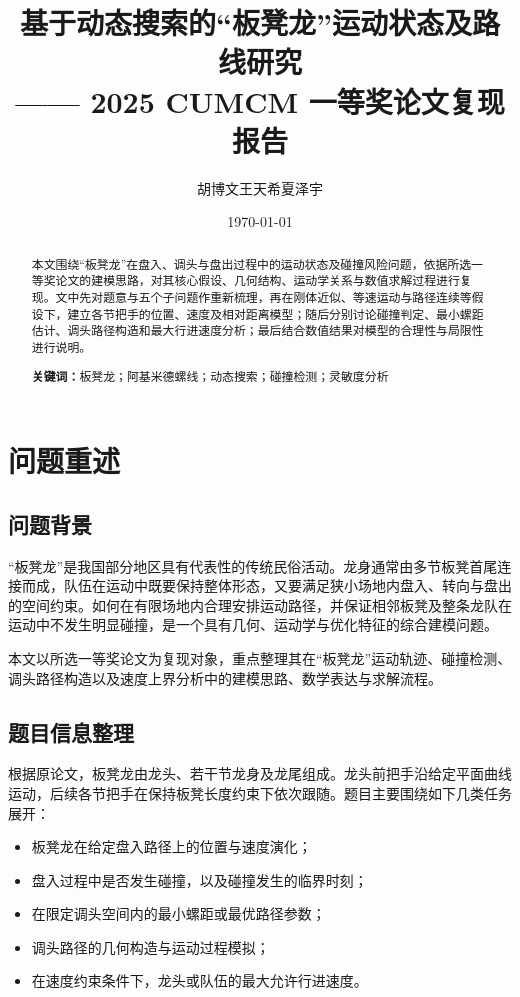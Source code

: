 \documentclass[12pt,a4paper]{ctexart}
\title{\heiti 基于动态搜索的“板凳龙”运动状态及路线研究\\[0.5em]
\large —— 2025 CUMCM 一等奖论文复现报告}
\author{胡博文\quad 王天希\quad 夏泽宇}
\date{\today}
\begin{document}
\maketitle

\begin{abstract}
本文围绕“板凳龙”在盘入、调头与盘出过程中的运动状态及碰撞风险问题，依据所选一等奖论文的建模思路，对其核心假设、几何结构、运动学关系与数值求解过程进行复现。文中先对题意与五个子问题作重新梳理，再在刚体近似、等速运动与路径连续等假设下，建立各节把手的位置、速度及相对距离模型；随后分别讨论碰撞判定、最小螺距估计、调头路径构造和最大行进速度分析；最后结合数值结果对模型的合理性与局限性进行说明。

\textbf{关键词：}板凳龙；阿基米德螺线；动态搜索；碰撞检测；灵敏度分析
\end{abstract}

\tableofcontents
\newpage

\section{问题重述}

\subsection{问题背景}
“板凳龙”是我国部分地区具有代表性的传统民俗活动。龙身通常由多节板凳首尾连接而成，队伍在运动中既要保持整体形态，又要满足狭小场地内盘入、转向与盘出的空间约束。如何在有限场地内合理安排运动路径，并保证相邻板凳及整条龙队在运动中不发生明显碰撞，是一个具有几何、运动学与优化特征的综合建模问题。

本文以所选一等奖论文为复现对象，重点整理其在“板凳龙”运动轨迹、碰撞检测、调头路径构造以及速度上界分析中的建模思路、数学表达与求解流程。

\subsection{题目信息整理}
根据原论文，板凳龙由龙头、若干节龙身及龙尾组成。龙头前把手沿给定平面曲线运动，后续各节把手在保持板凳长度约束下依次跟随。题目主要围绕如下几类任务展开：
\begin{itemize}[leftmargin=2em]
    \item 板凳龙在给定盘入路径上的位置与速度演化；
    \item 盘入过程中是否发生碰撞，以及碰撞发生的临界时刻；
    \item 在限定调头空间内的最小螺距或最优路径参数；
    \item 调头路径的几何构造与运动过程模拟；
    \item 在速度约束条件下，龙头或队伍的最大允许行进速度。
\end{itemize}
\end{document}
